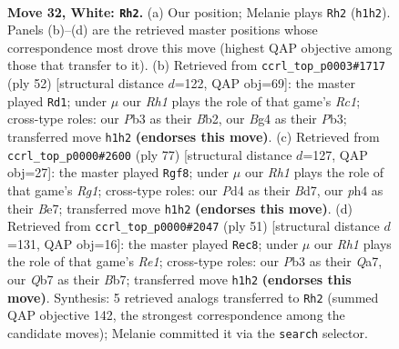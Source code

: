 \documentclass[11pt]{article}
\begin{document}
\clearpage

\begin{figure}[p]\centering
\begin{subfigure}{0.46\textwidth}\centering
\resizebox{\linewidth}{!}{%
\newchessgame
\chessboard[
  setfen={1n1qkbr1/1Q2n3/r1p3p1/p2p2P1/3P1PBp/1P5P/1BP5/R2N1K1R w - - 7 32},
  showmover=false,
  pgfstyle=straightmove, color=movearrow, markmove={h1-h2}
]}
\caption{}
\end{subfigure}\hfill
\begin{subfigure}{0.46\textwidth}\centering
\resizebox{\linewidth}{!}{%
\newchessgame
\chessboard[
  setfen={3r2k1/p3bpp1/2B2nq1/3nQ2p/Np6/1P4PP/PB3P2/2R3K1 w - - 1 27},
  showmover=false,
  pgfstyle=straightmove, color=movearrow, markmove={c1-d1}
]}
\caption{}
\end{subfigure}
\\[4pt]
\begin{subfigure}{0.46\textwidth}\centering
\resizebox{\linewidth}{!}{%
\newchessgame
\chessboard[
  setfen={k1r3r1/1p1bb3/2n1p3/qN1p4/4p1N1/PQ5P/2R2PP1/1R3BK1 b - - 5 39},
  showmover=false,
  pgfstyle=straightmove, color=movearrow, markmove={g8-f8}
]}
\caption{}
\end{subfigure}\hfill
\begin{subfigure}{0.46\textwidth}\centering
\resizebox{\linewidth}{!}{%
\newchessgame
\chessboard[
  setfen={4r1k1/qbr1bpp1/p4n1p/PpP5/8/1NN2BP1/1PQ2PP1/R1R3K1 b - - 0 26},
  showmover=false,
  pgfstyle=straightmove, color=movearrow, markmove={e8-c8}
]}
\caption{}
\end{subfigure}
\caption{\textbf{Move 32, White: \texttt{Rh2}.} (a) Our position; Melanie plays \texttt{Rh2} (\texttt{h1h2}). Panels (b)--(d) are the retrieved master positions whose correspondence most drove this move (highest QAP objective among those that transfer to it). (b) Retrieved from \texttt{ccrl\_top\_p0003\#1717} (ply 52) [structural distance $d$=122, QAP obj=69]: the master played \texttt{Rd1}; under $\mu$ our \emph{Rh1} plays the role of that game's \emph{Rc1}; cross-type roles: our \emph{P}b3 as their \emph{B}b2, our \emph{B}g4 as their \emph{P}b3; transferred move \texttt{h1h2} \textbf{(endorses this move)}. (c) Retrieved from \texttt{ccrl\_top\_p0000\#2600} (ply 77) [structural distance $d$=127, QAP obj=27]: the master played \texttt{Rgf8}; under $\mu$ our \emph{Rh1} plays the role of that game's \emph{Rg1}; cross-type roles: our \emph{P}d4 as their \emph{B}d7, our \emph{p}h4 as their \emph{B}e7; transferred move \texttt{h1h2} \textbf{(endorses this move)}. (d) Retrieved from \texttt{ccrl\_top\_p0000\#2047} (ply 51) [structural distance $d$=131, QAP obj=16]: the master played \texttt{Rec8}; under $\mu$ our \emph{Rh1} plays the role of that game's \emph{Re1}; cross-type roles: our \emph{P}b3 as their \emph{Q}a7, our \emph{Q}b7 as their \emph{B}b7; transferred move \texttt{h1h2} \textbf{(endorses this move)}. Synthesis: 5 retrieved analogs transferred to \texttt{Rh2} (summed QAP objective 142, the strongest correspondence among the candidate moves); Melanie committed it via the \texttt{search} selector.}
\label{fig:thought-m62}
\end{figure}
\end{document}
